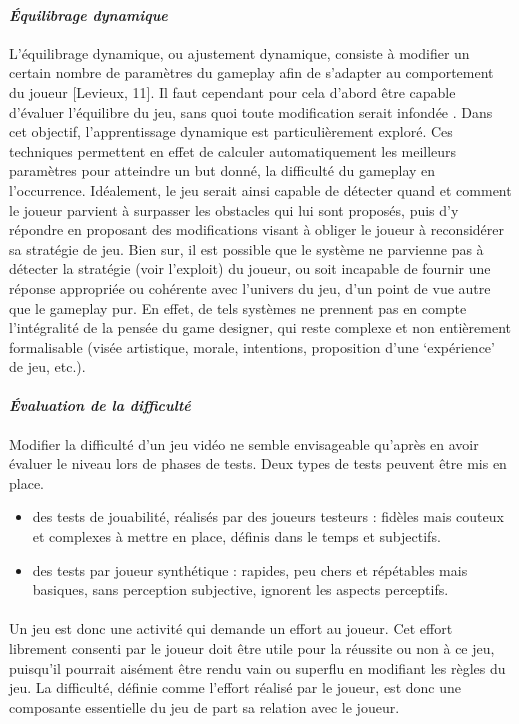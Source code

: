 		\paragraph{\emph{Équilibrage dynamique} \\ \quad}
L’équilibrage dynamique, ou ajustement dynamique, consiste à modifier un certain nombre de paramètres du gameplay afin de s’adapter au comportement du joueur [Levieux, 11]. Il faut cependant pour cela d’abord être capable d’évaluer l’équilibre du jeu, sans quoi toute modification serait infondée . Dans cet objectif, l’apprentissage dynamique est particulièrement exploré. Ces techniques permettent en effet de calculer automatiquement les meilleurs paramètres pour atteindre un but donné, la difficulté du gameplay en l'occurrence. Idéalement, le jeu serait ainsi capable de détecter quand et comment le joueur parvient à surpasser les obstacles qui lui sont proposés, puis d’y répondre en proposant des modifications visant à obliger le joueur à reconsidérer sa stratégie de jeu. Bien sur, il est possible que le système ne parvienne pas à détecter la stratégie (voir l’exploit) du joueur, ou soit incapable de fournir une réponse appropriée ou cohérente avec l’univers du jeu, d’un point de vue autre que le gameplay pur. En effet, de tels systèmes ne prennent pas en compte l’intégralité de la pensée du game designer, qui reste complexe et non entièrement formalisable (visée artistique, morale, intentions, proposition d’une ‘expérience’ de jeu, etc.).

		\paragraph{\emph{Évaluation de la difficulté}\\ \quad}
Modifier la difficulté d'un jeu vidéo ne semble envisageable qu'après en avoir évaluer le niveau lors de phases de tests. Deux types de tests peuvent être mis en place. 
\begin{itemize}
	\item des tests de jouabilité, réalisés par des joueurs testeurs : fidèles mais couteux et complexes à mettre en place, définis dans le temps et subjectifs.
	\item des tests par joueur synthétique : rapides, peu chers et répétables mais basiques, sans perception subjective, ignorent les aspects perceptifs.
\end {itemize}

\paragraph{}Un jeu est donc une activité qui demande un effort au joueur. Cet effort librement consenti par le joueur  doit être utile pour la réussite ou non à ce jeu, puisqu’il pourrait aisément être rendu vain ou superflu en modifiant les règles du jeu. La difficulté, définie comme l’effort réalisé par le joueur, est donc une composante essentielle du jeu de part sa relation avec le joueur.

